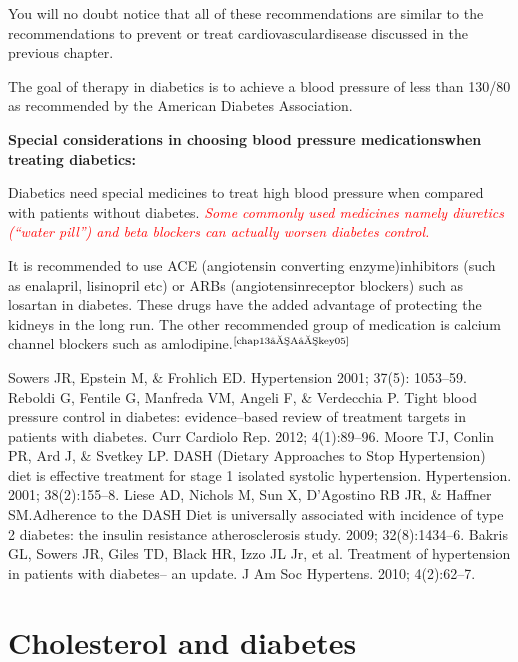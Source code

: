You will no doubt notice that all of these recommendations are similar to the recommendations to prevent or treat cardiovascular\break disease discussed in the previous chapter.

The goal of therapy in diabetics is to achieve a blood pressure of less than 130/80 as recommended by the American Diabetes Association.

\noindent\textbf{Special considerations in choosing blood pressure medications\break when treating diabetics:}

Diabetics need special medicines to treat high blood pressure when compared with patients without diabetes. \textcolor{red}{\textit{Some commonly used medicines namely diuretics (“water pill”) and beta blockers can actually worsen diabetes control.}}

It is recommended to use ACE (angiotensin converting enzyme)\break inhibitors (such as enalapril, lisinopril etc) or ARBs (angiotensin\break receptor blockers) such as losartan in diabetes. These drugs have the added advantage of protecting the kidneys in the long run. The other recommended group of medication is calcium channel blockers such as amlodipine.$^{\text{\cite{chap13–A–key05}}}$

\begin{thebibliography}{99}
 Sowers JR, Epstein M, \& Frohlich ED. Hypertension 2001; 37(5): 1053–59.
 Reboldi G, Fentile G, Manfreda VM, Angeli F, \& Verdecchia P. Tight blood pressure control in diabetes: evidence–based review of treatment targets in patients with diabetes. Curr Cardiolo Rep. 2012; 4(1):89–96.
 Moore TJ, Conlin PR, Ard J, \& Svetkey LP. DASH (Dietary Approaches to Stop Hypertension) diet is effective treatment for stage 1 isolated systolic hypertension. Hypertension. 2001; 38(2):155–8.
 Liese AD, Nichols M, Sun X, D’Agostino RB JR, \& Haffner SM.\break Adherence to the DASH Diet is universally associated with incidence of type 2 diabetes: the insulin resistance atherosclerosis study. 2009; 32(8):1434–6.
 Bakris GL, Sowers JR, Giles TD, Black HR, Izzo JL Jr, et al. Treatment of hypertension in patients with diabetes– an update. J Am Soc Hypertens. 2010; 4(2):62–7.
\end{thebibliography}

\newpage
 
\setcounter{chapter}{12}
\renewcommand{\thechapter}{\arabic{chapter}B}
\chapter{Cholesterol and diabetes}\label{chap13B}

